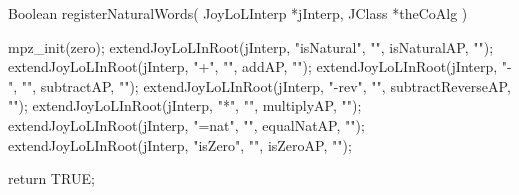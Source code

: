 \startCCode
Boolean registerNaturalWords(
  JoyLoLInterp *jInterp,
  JClass       *theCoAlg
) {
  mpz_init(zero);
  extendJoyLoLInRoot(jInterp, "isNatural", "", isNaturalAP,       "");
  extendJoyLoLInRoot(jInterp, "+",         "", addAP,             "");
  extendJoyLoLInRoot(jInterp, "-",         "", subtractAP,        "");
  extendJoyLoLInRoot(jInterp, "-rev",      "", subtractReverseAP, "");
  extendJoyLoLInRoot(jInterp, "*",         "", multiplyAP,        "");
  extendJoyLoLInRoot(jInterp, "=nat",      "", equalNatAP,        "");
  extendJoyLoLInRoot(jInterp, "isZero",    "", isZeroAP,          "");
  
  return TRUE;
}
\stopCCode
